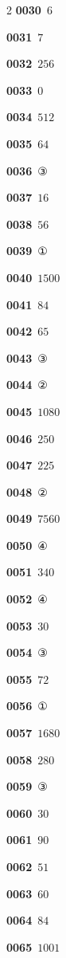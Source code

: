 \documentclass[10pt,a4paper]{article}
\begin{document}
\begin{multicols}{2}
\noindent\textbf{0030}\ $6$\par
\noindent\textbf{0031}\ $7$\par
\noindent\textbf{0032}\ $256$\par
\noindent\textbf{0033}\ $0$\par
\noindent\textbf{0034}\ $512$\par
\noindent\textbf{0035}\ $64$\par
\noindent\textbf{0036}\ ③\par
\noindent\textbf{0037}\ $16$\par
\noindent\textbf{0038}\ $56$\par
\noindent\textbf{0039}\ ①\par
\noindent\textbf{0040}\ $1500$\par
\noindent\textbf{0041}\ $84$\par
\noindent\textbf{0042}\ $65$\par
\noindent\textbf{0043}\ ③\par
\noindent\textbf{0044}\ ②\par
\noindent\textbf{0045}\ $1080$\par
\noindent\textbf{0046}\ $250$\par
\noindent\textbf{0047}\ $225$\par
\noindent\textbf{0048}\ ②\par
\noindent\textbf{0049}\ $7560$\par
\noindent\textbf{0050}\ ④\par
\noindent\textbf{0051}\ $340$\par
\noindent\textbf{0052}\ ④\par
\noindent\textbf{0053}\ $30$\par
\noindent\textbf{0054}\ ③\par
\noindent\textbf{0055}\ $72$\par
\noindent\textbf{0056}\ ①\par
\noindent\textbf{0057}\ $1680$\par
\noindent\textbf{0058}\ $280$\par
\noindent\textbf{0059}\ ③\par
\noindent\textbf{0060}\ $30$\par
\noindent\textbf{0061}\ $90$\par
\noindent\textbf{0062}\ $51$\par
\noindent\textbf{0063}\ $60$\par
\noindent\textbf{0064}\ $84$\par
\noindent\textbf{0065}\ $1001$\par

\end{multicols}
\end{document}

